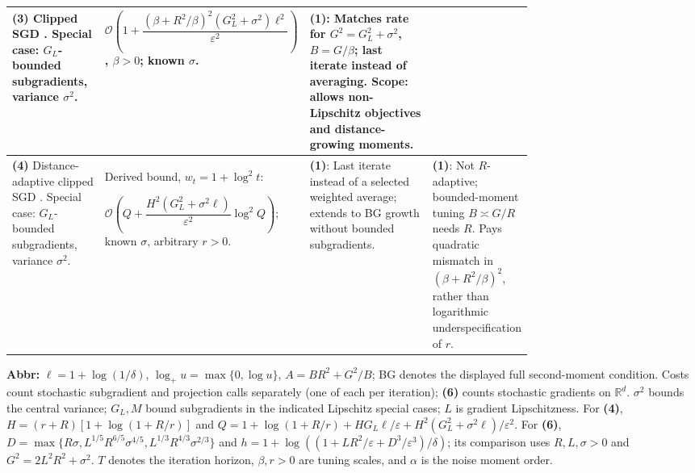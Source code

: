 \begin{table}[tp]
\begin{threeparttable}
\begin{tabularx}{\linewidth}{@{}>{\raggedright\arraybackslash}p{0.18\linewidth}>{\raggedright\arraybackslash}p{0.32\linewidth}>{\raggedright\arraybackslash}p{0.25\linewidth}>{\raggedright\arraybackslash}X@{}}
\midrule
\textbf{(3)} Clipped SGD \citep[Thm.~3, $p=2$]{tcLZ2023v3}. Special case: $G_L$-bounded subgradients, variance $\sigma^2$.
& $\mathcal{O}\!\left(1+\dfrac{(\beta+R^2/\beta)^2(G_L^2+\sigma^2)\ell^2}{\varepsilon^2}\right)$, $\beta>0$; known $\sigma$.
& \textbf{(1)}: Matches rate for $G^2=G_L^2+\sigma^2$, $B=G/\beta$; last iterate instead of averaging. Scope: allows non-Lipschitz objectives and distance-growing moments.
& \\
\midrule
\textbf{(4)} Distance-adaptive clipped SGD \citep[Thm.~6, $p=2$]{tcLZ2023v3}. Special case: $G_L$-bounded subgradients, variance $\sigma^2$.
& Derived bound, $w_t=1+\log^2t$:\par
$\mathcal{O}\!\left(Q+\dfrac{H^2(G_L^2+\sigma^2\ell)}{\varepsilon^2}\log^2 Q\right)$; known $\sigma$, arbitrary $r>0$.
& \textbf{(1)}: Last iterate instead of a selected weighted average; extends to BG growth without bounded subgradients.
& \textbf{(1)}: Not $R$-adaptive; bounded-moment tuning $B\asymp G/R$ needs $R$. Pays quadratic mismatch in $(\beta+R^2/\beta)^2$, rather than logarithmic underspecification of $r$. \\

\bottomrule
\end{tabularx}
\begin{tablenotes}[flushleft]\footnotesize
\item[] \textbf{Abbr:} $\ell=1+\log(1/\delta)$, $\log_+u=\max\{0,\log u\}$, $A=BR^2+G^2/B$; BG denotes the displayed full second-moment condition. Costs count stochastic subgradient and projection calls separately (one of each per iteration); \textbf{(6)} counts stochastic gradients on $\mathbb R^d$. $\sigma^2$ bounds the central variance; $G_L,M$ bound subgradients in the indicated Lipschitz special cases; $L$ is gradient Lipschitzness. For \textbf{(4)}, $H=(r+R)[1+\log(1+R/r)]$ and $Q=1+\log(1+R/r)+HG_L\ell/\varepsilon+H^2(G_L^2+\sigma^2\ell)/\varepsilon^2$. For \textbf{(6)}, $D=\max\{R\sigma,L^{1/5}R^{6/5}\sigma^{4/5},L^{1/3}R^{4/3}\sigma^{2/3}\}$ and $h=1+\log((1+LR^2/\varepsilon+D^3/\varepsilon^3)/\delta)$; its comparison uses $R,L,\sigma>0$ and $G^2=2L^2R^2+\sigma^2$. $T$ denotes the iteration horizon, $\beta,r>0$ are tuning scales, and $\alpha$ is the noise moment order.
\end{tablenotes}
\end{threeparttable}
\end{table}
\clearpage
